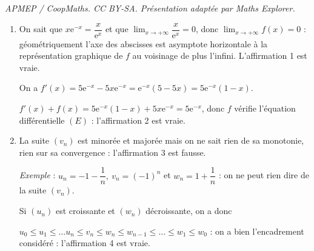 \documentclass[10pt]{article}
\providecommand{\e}{{\mathrm{e}}}
\begin{document}
\noindent\textit{APMEP / CoopMaths. CC BY-SA. Présentation adaptée par Maths Explorer.}\par\medskip
\medskip

\begin{enumerate}
\item On sait que $x \e^{-x} = \dfrac{x}{\e^x}$ et que $\displaystyle\lim_{x \to + \infty} \dfrac{x}{\e^x} = 0$, donc $\displaystyle\lim_{x \to + \infty}  f(x) = 0$ : géométriquement l'axe des abscisses est asymptote horizontale à la représentation graphique de $f$ au voisinage de plus l'infini. L'affirmation 1 est vraie.

On a $f'(x) = 5\e^{-x}  - 5x\e^{-x} = \e^{-x}(5 - 5x) = 5\e^{-x}(1 - x)$.

$f'(x) + f(x) = 5\e^{-x}(1 - x) + 5x\e^{-x}  = 5\e^{-x}$, donc $f$ vérifie l'équation différentielle $(E)$ : l'affirmation 2 est vraie.
\item La suite $\left(v_n\right)$ est minorée et majorée mais on ne sait rien de sa monotonie, rien sur sa convergence : l'affirmation 3 est fausse.

\emph{Exemple} : $u_n = - 1 - \dfrac 1n, \: v_n = (-1)^n$ et $w_n = 1 + \dfrac 1n$ : on ne peut rien dire de la suite $\left(v_n\right)$.

Si $\left(u_n\right)$ est croissante et $\left(w_n\right)$ décroissante, on a donc 

$u_0 \leqslant u_1 \leqslant \ldots u_n \leqslant v_n \leqslant w_n \leqslant w_{n - 1} \leqslant \ldots \leqslant w_1 \leqslant w_0$ : on a bien l'encadrement considéré : l'affirmation 4 est vraie.
\end{enumerate}

\bigskip
\end{document}
